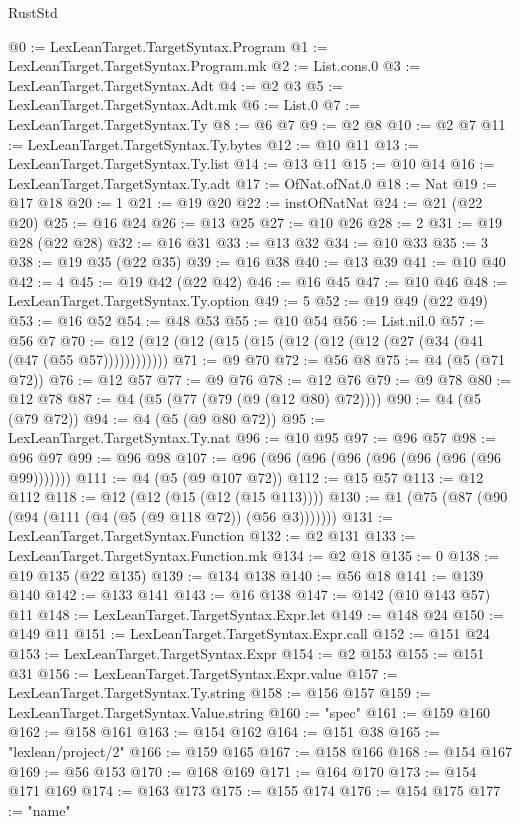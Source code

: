 \begin{lexlean}{RustStd}
\begin{coremodule}
@0 := LexLeanTarget.TargetSyntax.Program
@1 := LexLeanTarget.TargetSyntax.Program.mk
@2 := List.cons.{0}
@3 := LexLeanTarget.TargetSyntax.Adt
@4 := @2 @3
@5 := LexLeanTarget.TargetSyntax.Adt.mk
@6 := List.{0}
@7 := LexLeanTarget.TargetSyntax.Ty
@8 := @6 @7
@9 := @2 @8
@10 := @2 @7
@11 := LexLeanTarget.TargetSyntax.Ty.bytes
@12 := @10 @11
@13 := LexLeanTarget.TargetSyntax.Ty.list
@14 := @13 @11
@15 := @10 @14
@16 := LexLeanTarget.TargetSyntax.Ty.adt
@17 := OfNat.ofNat.{0}
@18 := Nat
@19 := @17 @18
@20 := 1
@21 := @19 @20
@22 := instOfNatNat
@24 := @21 (@22 @20)
@25 := @16 @24
@26 := @13 @25
@27 := @10 @26
@28 := 2
@31 := @19 @28 (@22 @28)
@32 := @16 @31
@33 := @13 @32
@34 := @10 @33
@35 := 3
@38 := @19 @35 (@22 @35)
@39 := @16 @38
@40 := @13 @39
@41 := @10 @40
@42 := 4
@45 := @19 @42 (@22 @42)
@46 := @16 @45
@47 := @10 @46
@48 := LexLeanTarget.TargetSyntax.Ty.option
@49 := 5
@52 := @19 @49 (@22 @49)
@53 := @16 @52
@54 := @48 @53
@55 := @10 @54
@56 := List.nil.{0}
@57 := @56 @7
@70 := @12 (@12 (@12 (@15 (@15 (@12 (@12 (@12 (@27 (@34 (@41 (@47 (@55 @57))))))))))))
@71 := @9 @70
@72 := @56 @8
@75 := @4 (@5 (@71 @72))
@76 := @12 @57
@77 := @9 @76
@78 := @12 @76
@79 := @9 @78
@80 := @12 @78
@87 := @4 (@5 (@77 (@79 (@9 (@12 @80) @72))))
@90 := @4 (@5 (@79 @72))
@94 := @4 (@5 (@9 @80 @72))
@95 := LexLeanTarget.TargetSyntax.Ty.nat
@96 := @10 @95
@97 := @96 @57
@98 := @96 @97
@99 := @96 @98
@107 := @96 (@96 (@96 (@96 (@96 (@96 (@96 (@96 @99)))))))
@111 := @4 (@5 (@9 @107 @72))
@112 := @15 @57
@113 := @12 @112
@118 := @12 (@12 (@15 (@12 (@15 @113))))
@130 := @1 (@75 (@87 (@90 (@94 (@111 (@4 (@5 (@9 @118 @72)) (@56 @3)))))))
@131 := LexLeanTarget.TargetSyntax.Function
@132 := @2 @131
@133 := LexLeanTarget.TargetSyntax.Function.mk
@134 := @2 @18
@135 := 0
@138 := @19 @135 (@22 @135)
@139 := @134 @138
@140 := @56 @18
@141 := @139 @140
@142 := @133 @141
@143 := @16 @138
@147 := @142 (@10 @143 @57) @11
@148 := LexLeanTarget.TargetSyntax.Expr.let
@149 := @148 @24
@150 := @149 @11
@151 := LexLeanTarget.TargetSyntax.Expr.call
@152 := @151 @24
@153 := LexLeanTarget.TargetSyntax.Expr
@154 := @2 @153
@155 := @151 @31
@156 := LexLeanTarget.TargetSyntax.Expr.value
@157 := LexLeanTarget.TargetSyntax.Ty.string
@158 := @156 @157
@159 := LexLeanTarget.TargetSyntax.Value.string
@160 := "spec"
@161 := @159 @160
@162 := @158 @161
@163 := @154 @162
@164 := @151 @38
@165 := "lexlean/project/2"
@166 := @159 @165
@167 := @158 @166
@168 := @154 @167
@169 := @56 @153
@170 := @168 @169
@171 := @164 @170
@173 := @154 @171 @169
@174 := @163 @173
@175 := @155 @174
@176 := @154 @175
@177 := "name"

\end{coremodule}
\end{lexlean}
